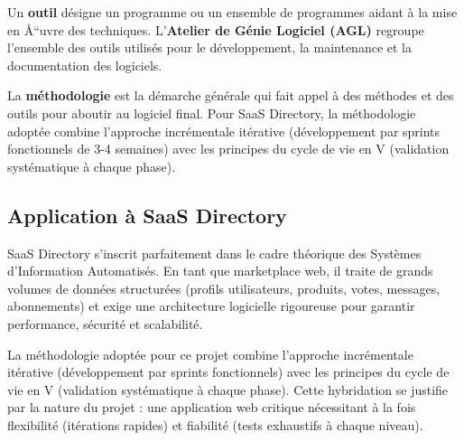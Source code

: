 Un \textbf{outil} désigne un programme ou un ensemble de programmes aidant à la mise en Å“uvre des techniques. L'\textbf{Atelier de Génie Logiciel (AGL)} regroupe l'ensemble des outils utilisés pour le développement, la maintenance et la documentation des logiciels.





La \textbf{méthodologie} est la démarche générale qui fait appel à des méthodes et des outils pour aboutir au logiciel final. Pour SaaS Directory, la méthodologie adoptée combine l'approche incrémentale itérative (développement par sprints fonctionnels de 3-4 semaines) avec les principes du cycle de vie en V (validation systématique à chaque phase).





\subsection{Application à SaaS Directory}





SaaS Directory s'inscrit parfaitement dans le cadre théorique des Systèmes d'Information Automatisés. En tant que marketplace web, il traite de grands volumes de données structurées (profils utilisateurs, produits, votes, messages, abonnements) et exige une architecture logicielle rigoureuse pour garantir performance, sécurité et scalabilité.





La méthodologie adoptée pour ce projet combine l'approche incrémentale itérative (développement par sprints fonctionnels) avec les principes du cycle de vie en V (validation systématique à chaque phase). Cette hybridation se justifie par la nature du projet : une application web critique nécessitant à la fois flexibilité (itérations rapides) et fiabilité (tests exhaustifs à chaque niveau).



